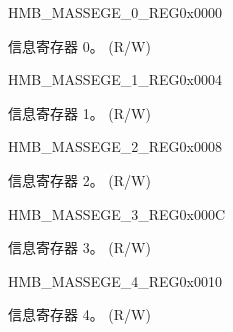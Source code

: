 \begin{register}{H}{MB\_MASSEGE\_0\_REG}{0x0000}\label{regdesc:MBMESSAGE0REG}
%
\regnewline%
\begin{regdesc}\begin{reglist}
\label{fielddesc:MBMESSAGE0}\item [MB\_MASSEGE\_0] 信息寄存器 0。 (R/W)
\end{reglist}\end{regdesc}
\end{register}


\begin{register}{H}{MB\_MASSEGE\_1\_REG}{0x0004}\label{regdesc:MBMESSAGE1REG}
%
\regnewline%
\begin{regdesc}\begin{reglist}
\label{fielddesc:MBMESSAGE1}\item [MB\_MASSEGE\_1] 信息寄存器 1。 (R/W)
\end{reglist}\end{regdesc}
\end{register}


\begin{register}{H}{MB\_MASSEGE\_2\_REG}{0x0008}\label{regdesc:MBMESSAGE2REG}
%
\regnewline%
\begin{regdesc}\begin{reglist}
\label{fielddesc:MBMESSAGE2}\item [MB\_MASSEGE\_2] 信息寄存器 2。 (R/W)
\end{reglist}\end{regdesc}
\end{register}


\begin{register}{H}{MB\_MASSEGE\_3\_REG}{0x000C}\label{regdesc:MBMESSAGE3REG}
%
\regnewline%
\begin{regdesc}\begin{reglist}
\label{fielddesc:MBMESSAGE3}\item [MB\_MASSEGE\_3] 信息寄存器 3。 (R/W)
\end{reglist}\end{regdesc}
\end{register}


\begin{register}{H}{MB\_MASSEGE\_4\_REG}{0x0010}\label{regdesc:MBMESSAGE4REG}
%
\regnewline%
\begin{regdesc}\begin{reglist}
\label{fielddesc:MBMESSAGE4}\item [MB\_MASSEGE\_4] 信息寄存器 4。 (R/W)
\end{reglist}\end{regdesc}
\end{register}



